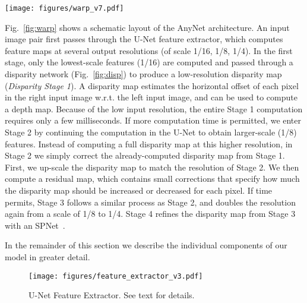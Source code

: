 \documentclass[letterpaper, 10 pt, conference]{ieeeconf}
\newcommand{\nameshort}[1]{AnyNet}
\begin{document}
\begin{figure*}[ht]
  \centering
\texttt{[image: figures/warp\_v7.pdf]}
  \caption{Network structure of \nameshort{}.}
  \label{fig:warp}
\end{figure*}

Fig.~\ref{fig:warp} shows a schematic layout of the \nameshort{} architecture. An input image pair first passes through the U-Net feature extractor, which computes feature maps at several output resolutions (of scale 1/16, 1/8, 1/4). In the first stage, only the lowest-scale features (1/16) are computed and passed through a disparity network (Fig.~\ref{fig:disp}) to produce a low-resolution disparity map (\emph{Disparity Stage 1}). A disparity map estimates the horizontal offset of each pixel in the right input image w.r.t. the left input image, and can be used to compute a depth map. 
Because of the low input resolution, the entire Stage 1 computation requires only a few milliseconds. If more computation time is permitted, we enter Stage 2 by continuing the computation in the U-Net to obtain larger-scale (1/8) features. 
Instead of computing a full disparity map at this higher resolution, in Stage 2 we simply correct the already-computed disparity map from Stage 1.  
First, we up-scale the disparity map to match the resolution of Stage 2. We then compute a residual map, which contains small corrections that specify how much the disparity map should be increased or decreased for each pixel.  
If time permits, Stage 3 follows a similar process as Stage 2, and doubles the resolution again from a scale of 1/8 to 1/4. Stage 4 refines the disparity map from Stage 3 with an SPNet~\cite{liu2017learning}. 













In the remainder of this section we describe the individual components of our model in greater detail.


\begin{figure}[t]
  \centering
\texttt{[image: figures/feature\_extractor\_v3.pdf]}

\caption{U-Net Feature Extractor. See text for details.}
  \label{fig:fe}
\vspace{-0.5cm}
\end{figure}
\end{document}
